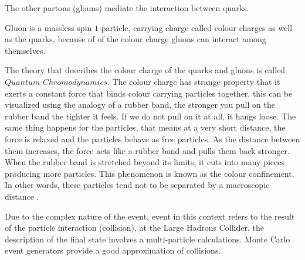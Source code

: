 The other partons (glouns)  mediate the interaction between quarks. 

Gluon is a massless spin $1$ particle, carrying charge called colour charges as well as the quarks, because of of the colour charge gluons can interact among themselves.

The theory that describes the colour charge of the quarks and gluons is called $Quantum$ $Chromodynamics$. The colour charge has strange property that it exerts a constant force that binds colour carrying particles together, this can be visualized using the analogy of a rubber band, the stronger you pull on the rubber band the tighter it feels.
If we do not pull on it at all, it hangs loose. The same thing happens for the particles,  that means at a very short distance, the force is relaxed and the particles behave as free particles. As the distance between them increases, the force acts like a rubber band and pulls them back stronger. When the rubber band is stretched beyond its limits, it cuts into many pieces producing more particles. This phenomenon is known as the colour confinement. In other words, these particles tend not to be separated by a macroscopic distance
 \citep{particle}.

Due to the complex nature of the event, event in this context refers to the result of the particle interaction (collision), at the Large Hadrons Collider, the description of the final state involves a multi-particle calculations. Monte Carlo event generators provide a good approximation of collisions.\label{sec}

